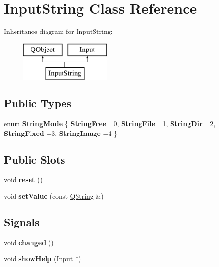 \hypertarget{class_input_string}{}\section{Input\+String Class Reference}
\label{class_input_string}
Inheritance diagram for Input\+String\+:\begin{figure}[H]
\begin{center}
\leavevmode
\includegraphics[height=2.000000cm]{class_input_string}
\end{center}
\end{figure}
\subsection*{Public Types}
\begin{DoxyCompactItemize}
\item 
\mbox{\label{class_input_string_a7cfa8b8ad573f92ac8a7c850cf63b04b}} 
enum {\bfseries String\+Mode} \{ \newline
{\bfseries String\+Free} =0, 
{\bfseries String\+File} =1, 
{\bfseries String\+Dir} =2, 
{\bfseries String\+Fixed} =3, 
\newline
{\bfseries String\+Image} =4
 \}
\end{DoxyCompactItemize}
\subsection*{Public Slots}
\begin{DoxyCompactItemize}
\item 
\mbox{\label{class_input_string_a1ef14657fbc414a6f15ca1f624d7da92}} 
void {\bfseries reset} ()
\item 
\mbox{\label{class_input_string_aa5dd91fe260eb01b911a4206e6653449}} 
void {\bfseries set\+Value} (const \mbox{\hyperlink{class_q_string}{Q\+String}} \&)
\end{DoxyCompactItemize}
\subsection*{Signals}
\begin{DoxyCompactItemize}
\item 
\mbox{\label{class_input_string_a652dc4c0483d77606295f32febcb746b}} 
void {\bfseries changed} ()
\item 
\mbox{\label{class_input_string_a9699d3bf0385d30c100c5cf2fb63012d}} 
void {\bfseries show\+Help} (\mbox{\hyperlink{class_input}{Input}} $\ast$)
\end{DoxyCompactItemize}
